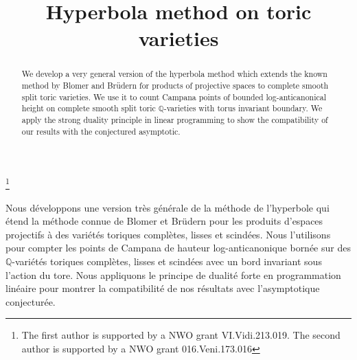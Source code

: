 \documentclass[JEP,XML,SOM,Unicode,published]{cedram}
\theoremstyle{definition}
\numberwithin{theorem}{section}
\begin{document}
\frontmatter

\title{Hyperbola method on toric varieties}

\author[\initial{M.} \lastname{Pieropan}]{ }
\address{Utrecht University, Mathematical Institute,\\
Budapestlaan 6, 3584 CD Utrecht, the Netherlands\\
\& EPFL SB MATH CAG,\\
B\^at. MA, Station 8, 1015 Lausanne, Switzerland}

\author[\initial{D.} \lastname{Schindler}]{ }
\address{Mathematisches Institut, Universität Göttingen,\\
Bunsenstraße 3-5, 37073 Göttingen, Germany}

\thanks{The first author is supported by a NWO grant VI.Vidi.213.019.
The second author is supported by a NWO grant 016.Veni.173.016}

\begin{abstract}
We develop a very general version of the hyperbola method which extends the known method by Blomer and Brüdern for products of projective spaces to complete smooth split toric varieties. We use it to count Campana points of bounded log-anticanonical height on complete smooth split toric $\mathbb{Q}$-varieties with torus invariant boundary. We apply the strong duality principle in linear programming to show the compatibility of our results with the conjectured asymptotic.
\end{abstract}




\begin{altabstract}
Nous développons une version très générale de la méthode de l'hyperbole qui étend la méthode connue de Blomer et Brüdern pour les produits d'espaces projectifs à des variétés toriques complètes, lisses et scindées. Nous l'utilisons pour compter les points de Campana de hauteur log-anticanonique bornée sur des $\mathbb{Q}$\nobreakdash-variétés toriques complètes, lisses et scindées avec un bord invariant sous l'action du tore. Nous appliquons le principe de dualité forte en programmation linéaire pour montrer la compatibilité de nos résultats avec l'asymptotique conjecturée.
\end{altabstract}
\end{document}
